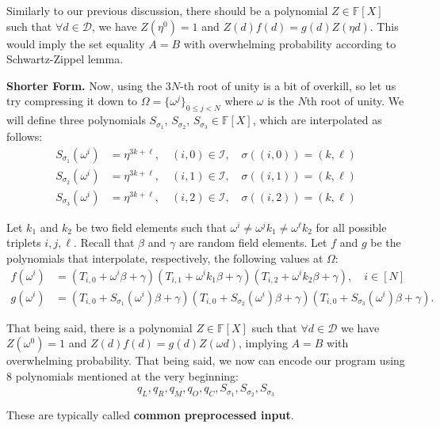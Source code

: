 \documentclass[../lecture-notes-148x210.tex]{subfiles}
\begin{document}
Similarly to our previous discussion, there should be a polynomial $Z \in
\mathbb{F}[X]$ such that $\forall d \in \mathcal{D}$, we have $Z(\eta^{0}) = 1$ and
$Z(d)f(d) = g(d)Z(\eta d)$. This would imply the set equality $A=B$ with
overwhelming probability according to Schwartz-Zippel lemma.

\textbf{Shorter Form.} Now, using the $3N$-th root of unity is a bit of overkill,
so let us try compressing it down to $\Omega = \{\omega^j\}_{0 \leq j < N}$
where $\omega$ is the $N$th root of unity. We will define three polynomials
$S_{\sigma_1}$, $S_{\sigma_2}$, $S_{\sigma_3} \in \mathbb{F}[X]$, which are
interpolated as follows:
\begin{align*}
    S_{\sigma_1}(\omega^i) &= \eta^{3k+\ell}, \quad (i, 0) \in \mathcal{I}, \quad \sigma((i, 0)) = (k, \ell) \\
    S_{\sigma_2}(\omega^i) &= \eta^{3k+\ell}, \quad (i, 1) \in \mathcal{I}, \quad \sigma((i, 1)) = (k, \ell) \\
    S_{\sigma_3}(\omega^i) &= \eta^{3k+\ell}, \quad (i, 2) \in \mathcal{I}, \quad \sigma((i, 2)) = (k, \ell)
\end{align*}

Let $k_1$ and $k_2$ be two field elements such that $\omega^i \neq \omega^j k_1
\neq \omega^{\ell} k_2$ for all possible triplets $i, j, \ell$. Recall that
$\beta$ and $\gamma$ are random field elements. Let $f$ and $g$ be the
polynomials that interpolate, respectively, the following values at $\Omega$:
\begin{align*}
    f(\omega^i) &=\left(T_{i,0} + \omega^i \beta + \gamma\right)\left(T_{i,1} + \omega^i k_1 \beta + \gamma\right)\left(T_{i,2} + \omega^i k_2 \beta + \gamma\right), \quad i \in [N] \\
    g(\omega^i) &= \left(T_{i,0} + S_{\sigma_1}(\omega^i) \beta + \gamma\right)\left(T_{i,0} + S_{\sigma_2}(\omega^i) \beta + \gamma\right)\left(T_{i,0} + S_{\sigma_3}(\omega^i) \beta + \gamma\right).
\end{align*}

That being said, there is a polynomial $Z \in \mathbb{F}[X]$ such that $\forall
d \in \mathcal{D}$ we have $Z(\omega^{0}) = 1$ and $Z(d)f(d) = g(d)Z(\omega d)$,
implying $A = B$ with overwhelming probability. That being said, we now can
encode our program using 8 polynomials mentioned at the very beginning:
\[q_L, q_R, q_M, q_O, q_C, S_{\sigma_1}, S_{\sigma_2}, S_{\sigma_3}\]

These are typically called \textbf{common preprocessed input}.
\end{document}
